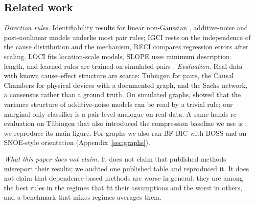 \subsection{Related work}\label{sec:related}
\emph{Direction rules.} Identifiability results for linear non-Gaussian \citep{shimizu2006linear}, additive-noise \citep{hoyer2009nonlinear,peters2014identifiability,zhang2009identifiability} and post-nonlinear models underlie most pair rules; IGCI \citep{daniusis2010inferring} rests on the independence of the cause distribution and the mechanism, RECI \citep{blobaum2018cause} compares regression errors after scaling, LOCI \citep{immer2023loci} fits location-scale models, SLOPE \citep{marx2017slope} uses minimum description length, and learned rules are trained on simulated pairs \citep{lopezpaz2015towards,lorch2022amortized}. \emph{Evaluation.} Real data with known cause--effect structure are scarce: T\"ubingen for pairs, the Causal Chambers \citep{gamella2025chamber} for physical devices with a documented graph, and the Sachs network, a consensus rather than a ground truth. On simulated graphs, \citet{reisach2021beware} showed that the variance structure of additive-noise models can be read by a trivial rule; our marginal-only classifier is a pair-level analogue on real data. A same-hands re-evaluation on T\"ubingen that also introduced the compression baseline we use is \citet{stienstra2026oneruler}; we reproduce its main figure. For graphs we also ran BF-BIC with BOSS \citep{ramsey2025bfbic} and an SNOE-style \citep{huang2025snoe} orientation (Appendix~\ref{sec:graphs}).

\emph{What this paper does not claim.} It does not claim that published methods misreport their results; we audited one published table and reproduced it. It does not claim that dependence-based methods are worse in general: they are among the best rules in the regimes that fit their assumptions and the worst in others, and a benchmark that mixes regimes averages them.
